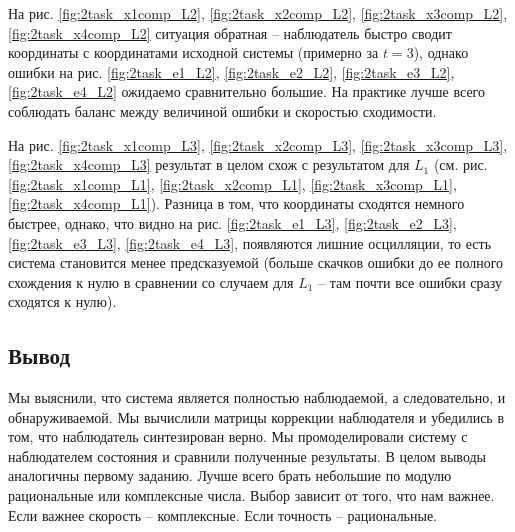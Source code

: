 \documentclass[a4paper, 12pt]{article}
\begin{document}
    На рис. \ref{fig:2task_x1comp_L2}, \ref{fig:2task_x2comp_L2}, \ref{fig:2task_x3comp_L2}, \ref{fig:2task_x4comp_L2} ситуация обратная -- наблюдатель быстро сводит координаты с координатами
    исходной системы (примерно за $t=3$), однако ошибки на рис. \ref{fig:2task_e1_L2}, \ref{fig:2task_e2_L2}, \ref{fig:2task_e3_L2}, \ref{fig:2task_e4_L2} ожидаемо сравнительно большие. На практике лучше всего
    соблюдать баланс между величиной ошибки и скоростью сходимости.


    На рис. \ref{fig:2task_x1comp_L3}, \ref{fig:2task_x2comp_L3}, \ref{fig:2task_x3comp_L3}, \ref{fig:2task_x4comp_L3} результат в целом схож с результатом для $L_1$ (см. рис. \ref{fig:2task_x1comp_L1}, \ref{fig:2task_x2comp_L1}, \ref{fig:2task_x3comp_L1}, \ref{fig:2task_x4comp_L1}).
    Разница в том, что координаты сходятся немного быстрее, однако, что видно на рис. \ref{fig:2task_e1_L3}, \ref{fig:2task_e2_L3}, \ref{fig:2task_e3_L3}, \ref{fig:2task_e4_L3}, появляются
    лишние осцилляции, то есть система становится менее предсказуемой (больше скачков ошибки до ее полного схождения к нулю
    в сравнении со случаем для $L_1$ -- там почти все ошибки сразу сходятся к нулю).

    
    \subsection{Вывод}
    Мы выяснили, что система является полностью наблюдаемой, а следовательно, и обнаруживаемой.
    Мы вычислили матрицы коррекции наблюдателя и убедились в том, что наблюдатель синтезирован верно.
    Мы промоделировали систему с наблюдателем состояния и сравнили полученные результаты. В целом
    выводы аналогичны первому заданию. Лучше всего брать небольшие по модулю рациональные или комплексные числа.
    Выбор зависит от того, что нам важнее. Если важнее скорость -- комплексные. Если точность -- рациональные.
\end{document}

